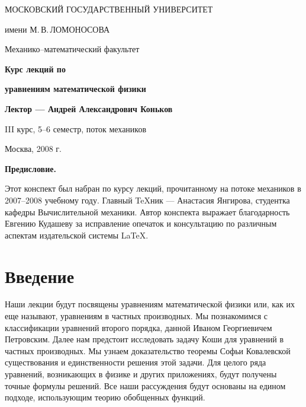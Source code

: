 \documentclass[unicode,12pt,draft]{article}
\begin{document}

\begin{titlepage}
\vskip40pt \centerline{\Large МОСКОВСКИЙ ГОСУДАРСТВЕННЫЙ
УНИВЕРСИТЕТ}
\medskip
\centerline{\Large имени М.\,В.\,ЛОМОНОСОВА}
\medskip
\centerline{\Large Механико--математический факультет}

\par\vskip40pt

\begin{figure}[htbp]
    \centering
    \centerline{}
\end{figure}

\par\vskip40pt

\centerline{\Huge\textbf{\textsf{Курс лекций по}}}
\medskip

\centerline{\Huge\textbf{\textsf{уравнениям математической
физики}}}
\medskip
\par\vskip30pt

\centerline{\Large\textbf{\textsf{Лектор --- Андрей Александрович
Коньков}}}
\medskip

\par\vskip70pt

\centerline{III курс, 5--6 семестр, поток механиков}

\par\vskip240pt

\centerline{Москва, 2008 г.}

\end{titlepage}

\newpage

\tableofcontents

\newpage

\begin{center}
\textbf{Предисловие.}\end{center} Этот конспект был набран по
курсу лекций, прочитанному на потоке механиков в 2007--2008
учебному году. Главный \TeX ник --- Анастасия Янгирова, студентка
кафедры Вычислительной механики. Автор конспекта выражает
благодарность Евгению Кудашеву за исправление опечаток и
консультацию по различным аспектам издательской системы \LaTeX.


\section*{Введение}

Наши лекции будут посвящены уравнениям математической физики или, как их еще называют,
уравнениям в частных производных.
Мы познакомимся с классификации уравнений второго порядка,
данной Иваном Георгиевичем Петровским.
Далее нам предстоит исследовать задачу Коши для уравнений в частных производных.
Мы узнаем доказательство теоремы Софьи Ковалевской существования и единственности
решения этой задачи.
Для целого ряда уравнений, возникающих в физике и других приложениях,
будут получены точные формулы решений.
Все наши рассуждения будут основаны на едином подходе, использующим теорию обобщенных функций.
\end{document}
